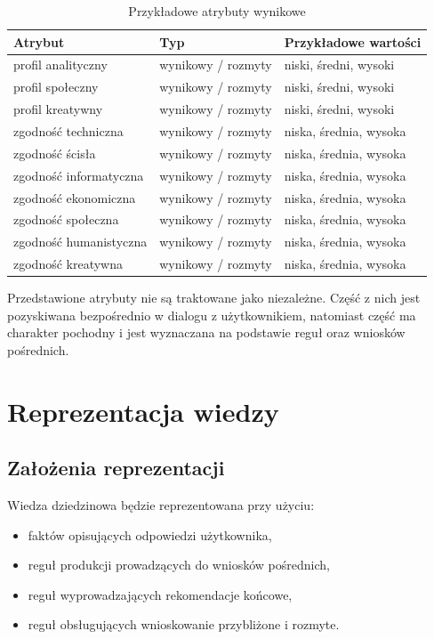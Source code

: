 \documentclass[12pt,a4paper,oneside]{article}
\begin{document}
\begin{table}[H]
\centering
\caption{Przykładowe atrybuty wynikowe}
\begin{tabular}{>{\raggedright\arraybackslash}p{4.6cm} >{\raggedright\arraybackslash}p{3.2cm} >{\raggedright\arraybackslash}p{6.2cm}}
\toprule
\textbf{Atrybut} & \textbf{Typ} & \textbf{Przykładowe wartości} \\
\midrule
profil analityczny & wynikowy / rozmyty & niski, średni, wysoki \\
profil społeczny & wynikowy / rozmyty & niski, średni, wysoki \\
profil kreatywny & wynikowy / rozmyty & niski, średni, wysoki \\
zgodność techniczna & wynikowy / rozmyty & niska, średnia, wysoka \\
zgodność ścisła & wynikowy / rozmyty & niska, średnia, wysoka \\
zgodność informatyczna & wynikowy / rozmyty & niska, średnia, wysoka \\
zgodność ekonomiczna & wynikowy / rozmyty & niska, średnia, wysoka \\
zgodność społeczna & wynikowy / rozmyty & niska, średnia, wysoka \\
zgodność humanistyczna & wynikowy / rozmyty & niska, średnia, wysoka \\
zgodność kreatywna & wynikowy / rozmyty & niska, średnia, wysoka \\
\bottomrule
\end{tabular}
\end{table}

Przedstawione atrybuty nie są traktowane jako niezależne. Część z nich jest pozyskiwana bezpośrednio w dialogu z użytkownikiem, natomiast część ma charakter pochodny i jest wyznaczana na podstawie reguł oraz wniosków pośrednich.
\newpage
\section{Reprezentacja wiedzy}

\subsection{Założenia reprezentacji}

Wiedza dziedzinowa będzie reprezentowana przy użyciu:
\begin{itemize}[leftmargin=1.2cm]
    \item faktów opisujących odpowiedzi użytkownika,
    \item reguł produkcji prowadzących do wniosków pośrednich,
    \item reguł wyprowadzających rekomendacje końcowe,
    \item reguł obsługujących wnioskowanie przybliżone i rozmyte.
\end{itemize}
\end{document}
